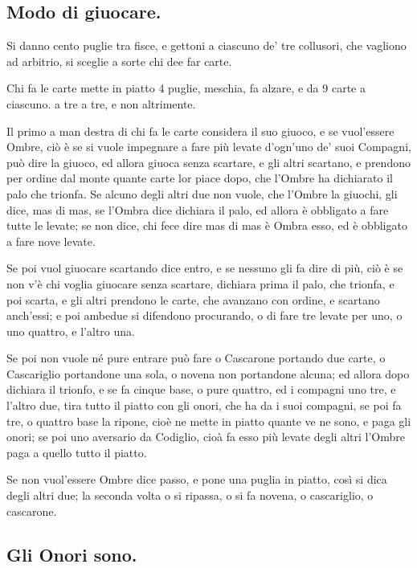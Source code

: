 \documentclass[11pt,a6paper]{article}
\begin{document}
\subsection{Modo di giuocare.}

Si danno cento puglie tra fisce, e gettoni
a ciascuno de' tre collusori, che vagliono
ad arbitrio, si sceglie a sorte chi dee far carte.

Chi fa le carte mette in piatto 4 puglie,
meschia, fa alzare, e da 9 carte a ciascuno.
a tre a tre, e non altrimente.

Il primo a man destra di chi fa le carte
considera il suo giuoco, e se vuol'essere
Ombre, ciò è se si vuole impegnare a fare più
levate d'ogn'uno de' suoi Compagni, può dire
la giuoco, ed allora giuoca senza scartare, e
gli altri scartano, e prendono per ordine dal
monte quante carte lor piace dopo, che l'Ombre
ha dichiarato il palo che trionfa. Se
alcuno degli altri due non vuole, che l'Ombre
la giuochi, gli dice, mas di mas, se l'Ombra
dice dichiara il palo, ed allora è obbligato a
fare tutte le levate; se non dice, chi fece
dire mas di mas è Ombra esso, ed è obbligato
a fare nove levate.

Se poi vuol giuocare scartando dice entro,
e se nessuno gli fa dire di più, ciò è se
non v'è chi voglia giuocare senza scartare,
dichiara prima il palo, che trionfa, e poi
scarta, e gli altri prendono le carte, che avanzano
con ordine, e scartano anch'essi; e poi
ambedue si difendono procurando, o di fare
tre levate per uno, o uno quattro, e l'altro
una.

Se poi non vuole né pure entrare può fare
o Cascarone portando due carte, o Cascariglio
portandone una sola, o novena non
portandone alcuna; ed allora dopo dichiara
il trionfo, e se fa cinque base, o pure
quattro, ed i compagni uno tre, e l'altro due,
tira tutto il piatto con gli onori, che ha da i
suoi compagni, se poi fa tre, o quattro base la
ripone, cioè ne mette in piatto quante ve ne
sono, e paga gli onori; se poi uno aversario
da Codiglio, cioà fa esso più levate degli altri
l'Ombre paga a quello tutto il piatto.

Se non vuol'essere Ombre dice passo, e
pone una puglia in piatto, così si dica degli
altri due; la seconda volta o si ripassa, o si fa
novena, o cascariglio, o cascarone.

\subsection{Gli Onori sono.}
\end{document}

